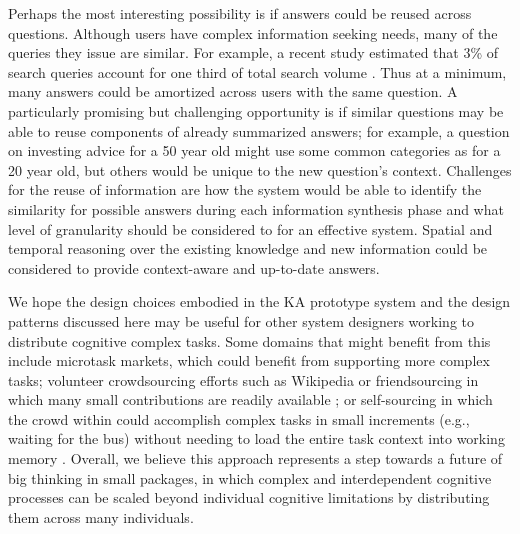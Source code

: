 Perhaps the most interesting possibility is if answers could be reused across questions. Although users have complex information seeking needs, many of the queries they issue are similar. For example, a recent study estimated that 3\% of search queries account for one third of total search volume \cite{white2007studying}. Thus at a minimum, many answers could be amortized across users with the same question. A particularly promising but challenging opportunity is if similar questions may be able to reuse components of already summarized answers; for example, a question on investing advice for a 50 year old might use some common categories as for a 20 year old, but others would be unique to the new question's context. Challenges for the reuse of information are how the system would be able to identify the similarity for possible answers during each information synthesis phase and what level of granularity should be considered to for an effective system. Spatial and temporal reasoning over the existing knowledge and new information could be considered to provide context-aware and up-to-date answers. 

We hope the design choices embodied in the KA prototype system and the design patterns discussed here may be useful for other system designers working to distribute cognitive complex tasks. Some domains that might benefit from this include microtask markets, which could benefit from supporting more complex tasks; volunteer crowdsourcing efforts such as Wikipedia \cite{kittur2008harnessing} or friendsourcing in which many small contributions are readily available \cite{bernstein2010personalization}; or self-sourcing in which the crowd within could accomplish complex tasks in small increments (e.g., waiting for the bus) without needing to load the entire task context into working memory \cite{teevan2014selfsourcing}. Overall, we believe this approach represents a step towards a future of big thinking in small packages, in which complex and interdependent cognitive processes can be scaled beyond individual cognitive limitations by distributing them across many individuals.




